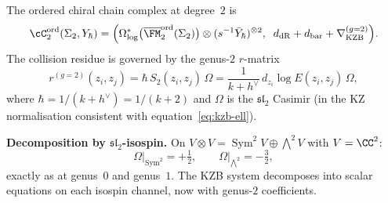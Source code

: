 The ordered chiral chain complex at degree~$2$ is
\begin{equation}\label{eq:g2-degree2-cx}
  \cC_2^{\mathrm{ord}}(\Sigma_2, Y_\hbar)
  = \Bigl(
  \Omega^*_{\log}\bigl(
  \overline{\FM}_2^{\mathrm{ord}}(\Sigma_2)\bigr)
  \otimes (s^{-1}\bar{Y}_\hbar)^{\otimes 2},
  \;\;
  d_{\mathrm{dR}} + d_{\mathrm{bar}}
  + \nabla_{\mathrm{KZB}}^{(g=2)}
  \Bigr).
\end{equation}
The collision residue is governed by the genus-$2$
$r$-matrix
\begin{equation}\label{eq:r-g2}
  r^{(g=2)}(z_i, z_j)
  = \hbar\,S_2(z_i, z_j)\,\Omega
  = \frac{1}{k + h^\vee}\,
  d_{z_i}\!\log E(z_i, z_j)\,\Omega,
\end{equation}
where $\hbar = 1/(k + h^\vee) = 1/(k+2)$ and $\Omega$
is the $\mathfrak{sl}_2$ Casimir (in the KZ normalisation
consistent with equation~\eqref{eq:kzb-ell}).

\smallskip
\noindent
\textbf{Decomposition by $\mathfrak{sl}_2$-isospin.}
On $V \otimes V = \operatorname{Sym}^2 V \oplus
\bigwedge\nolimits^2 V$ with $V = \CC^2$:
\[
  \Omega\big|_{\operatorname{Sym}^2} = +\tfrac{1}{2},
  \qquad
  \Omega\big|_{\bigwedge^2} = -\tfrac{3}{2},
\]
exactly as at genus~$0$ and genus~$1$. The KZB system
decomposes into scalar equations on each isospin channel,
now with genus-$2$ coefficients.

